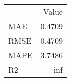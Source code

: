 \begin{tabular}{lr}
 & Value \\
MAE & 0.4709 \\
RMSE & 0.4709 \\
MAPE & 3.7486 \\
R2 & -inf \\
\end{tabular}
